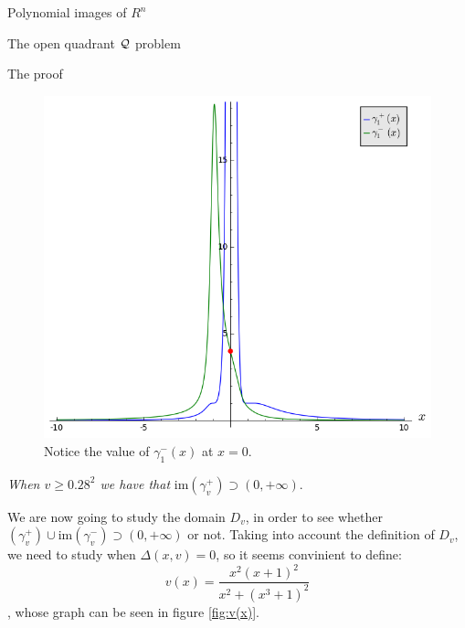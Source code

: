 \documentclass[11pt, a4paper, english, twoside, notitlepage]{report}
\begin{document}
\begin{chapter}{Polynomial images of $R^n$}
\begin{section}{The open quadrant $\mathcal{Q}$ problem}
\begin{subsection}{The proof}
\begin{Proof}
			\begin{figure}[h]
				\centering
				\includegraphics[width=1\textwidth]{plots/ch1_09_limit.png}
				\caption{Notice the value of $\gamma_1^-(x)$ at $x = 0$.\label{fig:limit}}
			\end{figure}

			\begin{center}
				 \emph{When $v \geq 0.28^2$ we have that} $\text{im}(\gamma_v^+) \supset (0, +\infty)$.
			\end{center}\label{step3}
			
			We are now going to study the domain $D_v$, in order to see whether $ (\gamma_v^+) \cup \text{im}(\gamma_v^-) \supset (0, +\infty)$ or not. Taking into account the definition of $D_v$, we need to study when $\Delta(x, v) = 0$, so it seems convinient to define:
			$$v(x)=\frac{x^2(x+1)^2}{x^2+(x^3+1)^2}$$, whose graph can be seen in figure \ref{fig:v(x)}.
			

\end{Proof}
\end{subsection}
\end{section}
\end{chapter}
\end{document}
